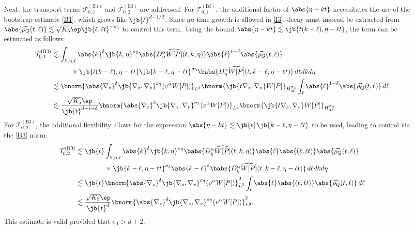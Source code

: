 Next, the transport terms $\mathcal{T}_{0,1}^{\mathrm{(B3)}}$ and $\mathcal{T}_{0,2}^{\mathrm{(B3)}}$ are addressed. For $\mathcal{T}_{0,1}^{\mathrm{(B3)}}$, the additional factor of $\abs{\eta-kt}$ necessitates the use of the bootstrap estimate \eqref{B1}, which grows like $\jb{t}^{d-1/2}$. Since no time growth is allowed in \eqref{I3}, decay must instead be extracted from $\abs{\widehat{\rho_Q}(t,\ell )}\lesssim\sqrt{K_5}\ep\jb{\ell ,\ell t}^{-\sigma_1}$ to control this term. Using the bound $\abs{\eta-kt}\lesssim\jb{t(k-\ell ),\eta-\ell t}$, the term can be estimated as follows:
\begin{align*}
\mathcal{T}_{0,1}^{\mathrm{(B3)}}&\lesssim\int_{k,\eta,\ell }\abs{k}^\delta\jb{k,\eta}^{\sigma_3}\abs{D_\eta^\alpha \widehat{W[P]}(t,k,\eta)}\abs{\ell }^{1+\delta}\abs{\widehat{\rho_Q}(t,\ell )}\\
&\hspace{1cm}\times\jb{t(k-\ell ),\eta-\ell t}\jb{k-\ell ,\eta-\ell t}^{\sigma_3}\babs{D_\eta^\alpha\widehat{W[P]}(t,k-\ell ,\eta-\ell t)}\,d\ell dkd\eta\\
&\lesssim\bnorm{\abs{\nabla_z}^\delta\jb{\nabla_z,\nabla_v}^{\sigma_3}(v^\alpha W[P])}_{L^2}\bnorm{\jb{t\nabla_z,\nabla_v}W[P]}_{H^{\sigma_4}_M}\int_\ell \abs{\ell }^{1+\delta}\abs{\widehat{\rho_Q}(t,\ell )}\,d\ell \\
&\lesssim\frac{\sqrt{K_5}\ep}{\jb{t}^{d+1+\delta}}\bnorm{\abs{\nabla_z}^\delta\jb{\nabla_z,\nabla_v}^{\sigma_3}(v^\alpha W[P])}_{L^2}\bnorm{\jb{t\nabla_z,\nabla_v}W[P]}_{H^{\sigma_4}_M}.
\end{align*}
For $\mathcal{T}_{0,2}^{\mathrm{(B3)}}$, the additional flexibility allows for the expression $\abs{\eta-kt}\lesssim\jb{t}\jb{k-\ell ,\eta-\ell t}$ to be used, leading to control via the \eqref{B3} norm:
\begin{align*}
\mathcal{T}_{0,2}^{\mathrm{(B3)}}&\lesssim\jb{t}\int_{k,\eta,\ell }\abs{k}^\delta\jb{k,\eta}^{\sigma_3}\babs{D_\eta^\alpha \widehat{W[P]}(t,k,\eta)}\abs{\ell }\abs{(\ell ,\ell t)}\abs{\widehat{\rho_Q}(t,\ell )}\\
&\hspace{1.5cm}\times\jb{k-\ell ,\eta-\ell t}^{\sigma_3}\abs{k-\ell }^{\delta}\babs{D_\eta^\alpha\widehat{W[P]}(t,k-\ell ,\eta-\ell t)}\,d\ell dkd\eta\\
&\lesssim\jb{t}\bnorm{\abs{\nabla_z}^\delta\jb{\nabla_z,\nabla_v}^{\sigma_3}(v^\alpha W[P])}_{L^2}^2\int_\ell \abs{\ell }\abs{(\ell ,\ell t)}\abs{\widehat{\rho_Q}(t,\ell )}\,d\ell \\
&\lesssim\frac{\sqrt{K_5}\ep}{\jb{t}^d}\bnorm{\abs{\nabla_z}^\delta\jb{\nabla_z,\nabla_v}^{\sigma_3}(v^\alpha W[P])}_{L^2}^2.
\end{align*}
This estimate is valid provided that $\sigma_1>d+2$.

